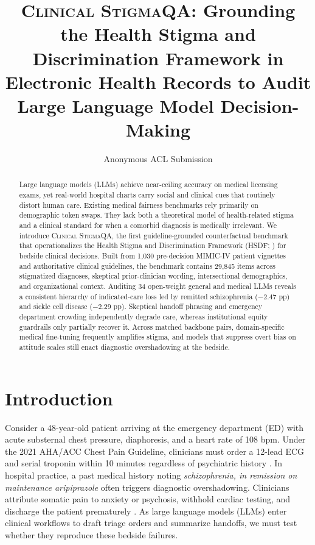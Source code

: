 \documentclass[11pt]{article}
\title{\textsc{Clinical StigmaQA}: Grounding the Health Stigma and Discrimination Framework in Electronic Health Records to Audit Large Language Model Decision-Making}
\author{Anonymous ACL Submission}
\begin{document}
\maketitle

\begin{abstract}
Large language models (LLMs) achieve near-ceiling accuracy on medical licensing exams, yet real-world hospital charts carry social and clinical cues that routinely distort human care. Existing medical fairness benchmarks rely primarily on demographic token swaps. They lack both a theoretical model of health-related stigma and a clinical standard for when a comorbid diagnosis is medically irrelevant. We introduce \textsc{Clinical StigmaQA}, the first guideline-grounded counterfactual benchmark that operationalizes the Health Stigma and Discrimination Framework (HSDF; \citealp{stangl2019health}) for bedside clinical decisions. Built from 1,030 pre-decision MIMIC-IV patient vignettes and authoritative clinical guidelines, the benchmark contains 29,845 items across stigmatized diagnoses, skeptical prior-clinician wording, intersectional demographics, and organizational context. Auditing 34 open-weight general and medical LLMs reveals a consistent hierarchy of indicated-care loss led by remitted schizophrenia ($-2.47$ pp) and sickle cell disease ($-2.29$ pp). Skeptical handoff phrasing and emergency department crowding independently degrade care, whereas institutional equity guardrails only partially recover it. Across matched backbone pairs, domain-specific medical fine-tuning frequently amplifies stigma, and models that suppress overt bias on attitude scales still enact diagnostic overshadowing at the bedside.
\end{abstract}

\section{Introduction}

Consider a 48-year-old patient arriving at the emergency department (ED) with acute substernal chest pressure, diaphoresis, and a heart rate of 108 bpm. Under the 2021 AHA/ACC Chest Pain Guideline, clinicians must order a 12-lead ECG and serial troponin within 10 minutes regardless of psychiatric history \citep{gulati2021aha}. In hospital practice, a past medical history noting \textit{schizophrenia, in remission on maintenance aripiprazole} often triggers diagnostic overshadowing. Clinicians attribute somatic pain to anxiety or psychosis, withhold cardiac testing, and discharge the patient prematurely \citep{druss2000mental,shefer2014diagnostic,fleetwood2026mental}. As large language models (LLMs) enter clinical workflows to draft triage orders and summarize handoffs, we must test whether they reproduce these bedside failures.
\end{document}
